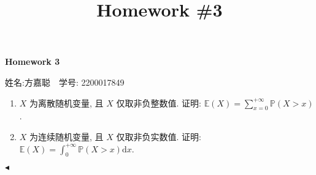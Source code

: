 \documentclass[11pt]{article}
\title{Homework \#3}
\newenvironment{problem}[2][Problem]{\begin{trivlist}
    \item[\hskip \labelsep {\bfseries #1}\hskip \labelsep {\bfseries #2.}]\songti}{\hfill$\blacktriangleleft$\end{trivlist}}
\newcommand\1{\mathds{1}}
\newcommand\E{\mathbb{E}}
\newcommand\PP{\mathbb{P}}
\newcommand\dd{\mathrm{d}}
\begin{document}
\kaishu

\pagestyle{fancy}
\chead{}
\fancyfoot[R]{} 
\fancyfoot[C]{\thepage\ /\ \pageref{LastPage} \\ \textcolor{lightgray}{最后编译时间: \today}}


\begin{center}
    {\LARGE \bf Homework 3}

    {姓名:方嘉聪\ \  学号: 2200017849}            %
\end{center}

\begin{problem}{1}
    \begin{enumerate}[label=(\arabic*)]
        \item $X$ 为离散随机变量, 且 $X$ 仅取非负整数值. 证明: $\E(X) = \sum_{x=0}^{+\infty}\PP(X>x)$.
        \item $X$ 为连续随机变量, 且 $X$ 仅取非负实数值. 证明: $\E(X) = \int_{0}^{+\infty}\PP(X>x)\dd x$.
    \end{enumerate}
\end{problem}
\end{document}
